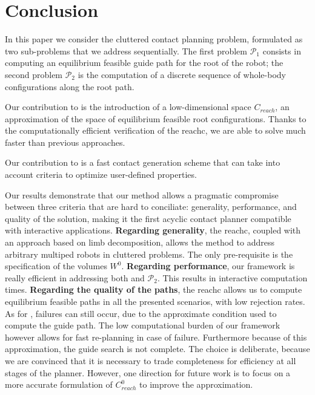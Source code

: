 \section{Conclusion} 
\label{sec:conclusion}

In this paper we consider the \gls{cluttered} contact planning problem, formulated as two sub-problems that we address sequentially.
The first problem $\mathcal{P}_1$ consists in computing an \gls{equilibrium feasible} guide path for the root of the robot;
 the second problem $\mathcal{P}_2$ is the computation of a discrete sequence of whole-body configurations along the root path.

Our contribution to \Pa is the introduction of a low-dimensional space $C_{reach}$, an approximation of the space of \gls{equilibrium feasible} root configurations.
Thanks to the computationally efficient verification of the \gls{reachc}, we are able to solve \Pa much faster than previous approaches.

Our contribution to \Pb is a fast contact generation scheme that can take into
account criteria to optimize user-defined properties.

Our results demonstrate that our method allows a pragmatic compromise between three 
criteria that are hard to conciliate: generality, performance, and quality of the solution, making it the first acyclic contact
planner compatible with \gls{interactive} applications.
%
\textbf{Regarding generality}, the \gls{reachc}, coupled with an approach based on limb decomposition, 
allows the method to address arbitrary multiped robots in \gls{cluttered} problems. The only pre-requisite is the specification 
of the volumes $W^0$.
%
\textbf{Regarding performance}, our framework is really efficient in addressing both \Pa and $\mathcal{P}_2$. This results in \gls{interactive} computation times.
%
\textbf{Regarding the quality of the paths}, the \gls{reachc} allows us to compute
\gls{equilibrium feasible} paths in all the presented scenarios, with low rejection rates.
As for \cite{Bouyarmane2009}, failures can still occur, due to the approximate condition used to compute the guide path.
The low computational burden of our framework however allows for fast re-planning in case of failure.
Furthermore because of this approximation, the guide search is not complete. The choice is deliberate, because we are convinced
that it is necessary to trade completeness for efficiency at all stages of the planner.
However, one direction for future work is to focus on a more accurate formulation of $C_{reach}^0$ to improve
the approximation.

